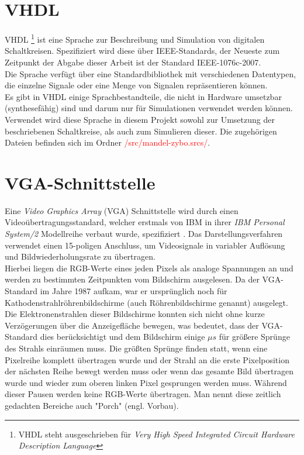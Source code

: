 \documentclass[a4paper,12pt,onesided]{report}
\begin{document}
\section{VHDL}
\label{sec:vhdl}
VHDL \footnote{VHDL steht ausgeschrieben für \textit{Very High Speed Integrated Circuit Hardware Description Language}} ist eine Sprache zur Beschreibung und Simulation von digitalen Schaltkreisen.
Spezifiziert wird diese über IEEE-Standards, der Neueste zum Zeitpunkt der Abgabe dieser Arbeit ist der Standard IEEE-1076c-2007\cite{ieeevhdl}.\\
Die Sprache verfügt über eine Standardbibliothek mit verschiedenen Datentypen, die einzelne Signale oder eine Menge von Signalen repräsentieren können.\\
Es gibt in VHDL einige Sprachbestandteile, die nicht in Hardware umsetzbar (synthesefähig) sind und darum nur für Simulationen verwendet werden können.
Verwendet wird diese Sprache in diesem Projekt sowohl zur Umsetzung der beschriebenen Schaltkreise, als auch zum Simulieren dieser.
Die zugehörigen Dateien befinden sich im Ordner \textcolor{red}{/src/mandel-zybo.srcs/}.

\section{VGA-Schnittstelle}
\label{sec:vga}
Eine \textit{Video Graphics Array} (VGA) Schnittstelle wird durch einen Videoübertragungsstandard, welcher erstmals von IBM in ihrer \textit{IBM Personal System/2} Modellreihe verbaut wurde, spezifiziert \cite{ibmTimeline}. 
Das Darstellungsverfahren verwendet einen 15-poligen Anschluss, um Videosignale in variabler Auflösung und Bildwiederholungsrate zu übertragen.\\
Hierbei liegen die RGB-Werte eines jeden Pixels als analoge Spannungen an und werden zu bestimmten Zeitpunkten vom Bildschirm ausgelesen. 
Da der VGA-Standard im Jahre 1987 aufkam, war er ursprünglich noch für  Kathodenstrahlröhrenbildschirme (auch Röhrenbildschirme genannt) ausgelegt. 
Die Elektronenstrahlen dieser Bildschirme konnten sich nicht ohne kurze Verzögerungen über die Anzeigefläche bewegen, was bedeutet, dass der VGA-Standard dies berücksichtigt und dem Bildschirm einige $\mu s$ für größere Sprünge des Strahls einräumen muss.
Die größten Sprünge finden statt, wenn eine Pixelreihe komplett übertragen wurde und der Strahl an die erste Pixelposition der nächsten Reihe bewegt werden muss oder wenn das gesamte Bild übertragen wurde und wieder zum oberen linken Pixel gesprungen werden muss.
Während dieser Pausen werden keine RGB-Werte übertragen.
Man nennt diese zeitlich gedachten Bereiche auch "Porch" (engl. Vorbau).\\
\end{document}
